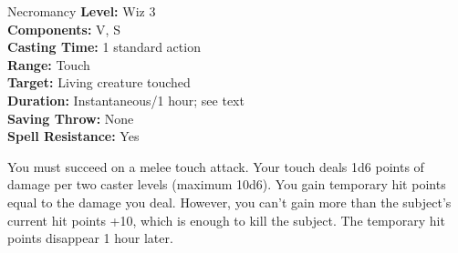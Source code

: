 {Necromancy}
{
	\textbf{Level:}
	Wiz 3\\
	\textbf{Components:}
	V, S\\
	\textbf{Casting Time:}
	1 standard action\\
	\textbf{Range:}
	Touch\\
	\textbf{Target:}
	Living creature touched\\
	\textbf{Duration:}
	Instantaneous/1 hour; see text\\
	\textbf{Saving Throw:}
	None\\
	\textbf{Spell Resistance:}
	Yes\\
}
{
	You must succeed on a melee touch attack. Your touch deals 1d6 points of damage per two caster levels (maximum 10d6). You gain temporary hit points equal to the damage you deal. However, you can't gain more than the subject's current hit points +10, which is enough to kill the subject. The temporary hit points disappear 1 hour later.

}
